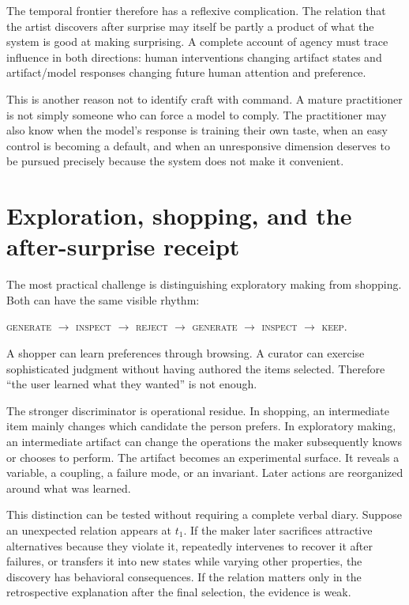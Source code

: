 \documentclass[11pt]{article}
\newcommand{\term}[1]{\textsc{#1}}
\begin{document}
The temporal frontier therefore has a reflexive complication. The relation that the artist discovers after surprise may itself be partly a product of what the system is good at making surprising. A complete account of agency must trace influence in both directions: human interventions changing artifact states and artifact/model responses changing future human attention and preference.

This is another reason not to identify craft with command. A mature practitioner is not simply someone who can force a model to comply. The practitioner may also know when the model's response is training their own taste, when an easy control is becoming a default, and when an unresponsive dimension deserves to be pursued precisely because the system does not make it convenient.

\section{Exploration, shopping, and the after-surprise receipt}

The most practical challenge is distinguishing exploratory making from shopping. Both can have the same visible rhythm:

\begin{center}
\term{generate $\rightarrow$ inspect $\rightarrow$ reject $\rightarrow$ generate $\rightarrow$ inspect $\rightarrow$ keep}.
\end{center}

A shopper can learn preferences through browsing. A curator can exercise sophisticated judgment without having authored the items selected. Therefore ``the user learned what they wanted'' is not enough.

The stronger discriminator is operational residue. In shopping, an intermediate item mainly changes which candidate the person prefers. In exploratory making, an intermediate artifact can change the operations the maker subsequently knows or chooses to perform. The artifact becomes an experimental surface. It reveals a variable, a coupling, a failure mode, or an invariant. Later actions are reorganized around what was learned.

This distinction can be tested without requiring a complete verbal diary. Suppose an unexpected relation appears at $t_1$. If the maker later sacrifices attractive alternatives because they violate it, repeatedly intervenes to recover it after failures, or transfers it into new states while varying other properties, the discovery has behavioral consequences. If the relation matters only in the retrospective explanation after the final selection, the evidence is weak.
\end{document}
